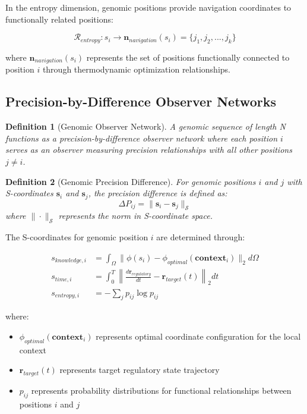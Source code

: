 \documentclass[12pt,a4paper]{article}
\newtheorem{definition}{Definition}
\begin{document}
In the entropy dimension, genomic positions provide navigation coordinates to functionally related positions:

\begin{equation}
\mathcal{R}_{entropy}: s_i \rightarrow \mathbf{n}_{navigation}(s_i) = \{j_1, j_2, ..., j_k\}
\end{equation}

where $\mathbf{n}_{navigation}(s_i)$ represents the set of positions functionally connected to position $i$ through thermodynamic optimization relationships.

\subsection{Precision-by-Difference Observer Networks}

\begin{definition}[Genomic Observer Network]
A genomic sequence of length N functions as a precision-by-difference observer network where each position $i$ serves as an observer measuring precision relationships with all other positions $j \neq i$.
\end{definition}

\begin{definition}[Genomic Precision Difference]
For genomic positions $i$ and $j$ with S-coordinates $\mathbf{s}_i$ and $\mathbf{s}_j$, the precision difference is defined as:
\begin{equation}
\Delta P_{ij} = \|\mathbf{s}_i - \mathbf{s}_j\|_{\mathcal{S}}
\end{equation}
where $\|\cdot\|_{\mathcal{S}}$ represents the norm in S-coordinate space.
\end{definition}

The S-coordinates for genomic position $i$ are determined through:

\begin{align}
s_{knowledge,i} &= \int_{\Omega} \|\phi(s_i) - \phi_{optimal}(\mathbf{context}_i)\|_2 d\Omega \\
s_{time,i} &= \int_0^T \left\|\frac{d\mathbf{r}_{regulatory}}{dt} - \mathbf{r}_{target}(t)\right\|_2 dt \\
s_{entropy,i} &= -\sum_{j} p_{ij} \log p_{ij}
\end{align}

where:
\begin{itemize}
\item $\phi_{optimal}(\mathbf{context}_i)$ represents optimal coordinate configuration for the local context
\item $\mathbf{r}_{target}(t)$ represents target regulatory state trajectory
\item $p_{ij}$ represents probability distributions for functional relationships between positions $i$ and $j$
\end{itemize}
\end{document}
